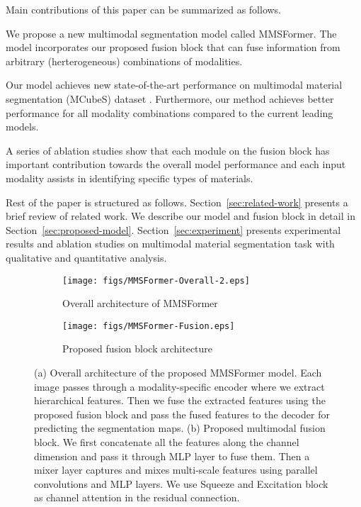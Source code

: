 \documentclass{article}
\newcommand{\squishlist}{
   \begin{list}{}
    { \setlength{\itemsep}{0pt}      \setlength{\parsep}{3pt}
      \setlength{\topsep}{3pt}       \setlength{\partopsep}{0pt}
      \setlength{\leftmargin}{1.0em} \setlength{\labelwidth}{1em}
      \setlength{\labelsep}{0.5em} } }
\newcommand{\squishend}{
  \end{list}  }
\begin{document}
Main contributions of this paper can be summarized as follows. 
\squishlist
    \item We propose a new multimodal segmentation model called MMSFormer. The model incorporates our proposed fusion block that can fuse information from arbitrary (herterogeneous) combinations of modalities. 
\item Our model achieves new state-of-the-art performance on multimodal material segmentation (MCubeS) dataset \cite{Liang2022MCubeS}. Furthermore, our method achieves better performance for all modality combinations compared to the current leading models.
\item A series of ablation studies show that each module on the fusion block has important contribution towards the overall model performance and each input modality assists in identifying specific types of materials.
\squishend
Rest of the paper is structured as follows. Section~\ref{sec:related-work} presents a brief review of related work. We describe our model and fusion block in detail in Section~\ref{sec:proposed-model}. Section~\ref{sec:experiment} presents experimental results and ablation studies on multimodal material segmentation task with qualitative and quantitative analysis.


\begin{figure*}[t]
     \centering
     \begin{subfigure}[b]{0.80\textwidth}
         \centering
         \texttt{[image: figs/MMSFormer-Overall-2.eps]}
         \caption{Overall architecture of MMSFormer}
         \label{fig:model}
     \end{subfigure}
     \hfill
     \begin{subfigure}[b]{0.80\textwidth}
         \centering
         \texttt{[image: figs/MMSFormer-Fusion.eps]}
         \caption{Proposed fusion block architecture}
         \label{fig:fusion}
     \end{subfigure}
    \caption{(a) Overall architecture of the proposed MMSFormer model. Each image passes through a modality-specific encoder where we extract hierarchical features. Then we fuse the extracted features using the proposed fusion block and pass the fused features to the decoder for predicting the segmentation maps. (b) Proposed multimodal fusion block. We first concatenate all the features along the channel dimension and pass it through MLP layer to fuse them. Then a mixer layer captures and mixes multi-scale features using parallel convolutions and MLP layers. We use Squeeze and Excitation block as channel attention in the residual connection.}
    \label{fig:model-architecture}
\end{figure*}
\end{document}
